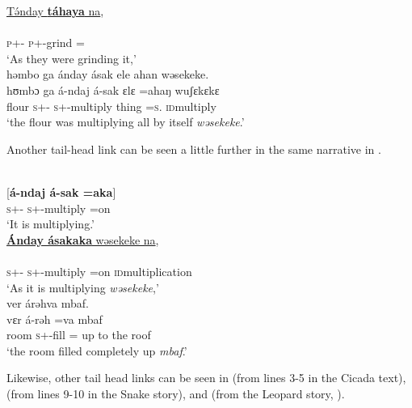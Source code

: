 \medskip
\underline{T\'ənday  \textbf{táhaya} na},\\
\gll {}    \\
     \textsc{p}+{\IFV}-{\PRG}  \textsc{p}+{\IFV}-grind  ={\PLU}    {\PSP}\\
\glt  ‘As they were grinding it,’\\ 

\medskip
 həmbo  ga  ánday  ásak  ele  ahan  wəsekeke. \\
\gll hʊmbɔ ga á-ndaj á-sak ɛlɛ =ahaŋ wuʃɛkɛkɛ\\
     flour   {\ADJ}  \textsc{s}+{\IFV}-{\PRG}  \textsc{s}+{\IFV}-multiply    thing  =\textsc{s}.{\POSS}  \textsc{id}multiply\\
\glt ‘the flour was multiplying all by itself \textit{wəsekeke}.’
\z

Another tail-head link can be seen a little further in the same narrative in . 

\ea \label{ex:11:22}\\     
\gll  {}[\textbf{á-ndaj  á-sak  =aka}]\\  
      \textsc{s}+{\IFV}-{\PROG} \textsc{s}+{\IFV}-multiply  =on \\  
\glt ‘It is multiplying.’\\

\medskip
\underline{\textbf{Ánday  ásakaka}  wəsekeke  na},\\
\gll {}    \\ 
     \textsc{s}+{\IFV}-{\PRG}  \textsc{s}+{\IFV}-multiply =on  \textsc{id}multiplication  {\PSP} \\
\glt ‘As it is multiplying \textit{wəsekeke},’\\

\medskip
ver  árəhva  mbaf.\\
\gll vɛr á-rəh =va mbaf\\
     room  \textsc{s}+{\IFV}-fill   ={\PRF}  {up to the roof}\\
\glt  ‘the room filled completely up \textit{mbaf}.’
\z

Likewise, other tail head links can be seen in  (from lines 3-5 in the Cicada text),  (from lines 9-10 in the Snake story), and  (from the Leopard story, \citealt{Friesen2003}). 

